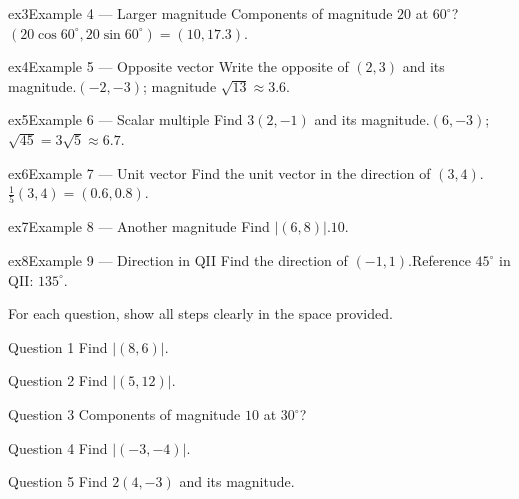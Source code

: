 \documentclass[11pt]{article}
\begin{document}
\begin{example}{ex3}{Example 4 --- Larger magnitude}
Components of magnitude $20$ at $60^\circ$?\soln $(20\cos60^\circ,20\sin60^\circ)=(10,17.3)$.
\end{example}

\begin{example}{ex4}{Example 5 --- Opposite vector}
Write the opposite of $(2,3)$ and its magnitude.\soln $(-2,-3)$; magnitude $\sqrt{13}\approx3.6$.
\end{example}

\begin{example}{ex5}{Example 6 --- Scalar multiple}
Find $3(2,-1)$ and its magnitude.\soln $(6,-3)$; $\sqrt{45}=3\sqrt5\approx6.7$.
\end{example}

\begin{example}{ex6}{Example 7 --- Unit vector}
Find the unit vector in the direction of $(3,4)$.\soln $\tfrac{1}{5}(3,4)=(0.6,0.8)$.
\end{example}

\begin{example}{ex7}{Example 8 --- Another magnitude}
Find $|(6,8)|$.\soln $10$.
\end{example}

\begin{example}{ex8}{Example 9 --- Direction in QII}
Find the direction of $(-1,1)$.\soln Reference $45^\circ$ in QII: $135^\circ$.
\end{example}

\clearpage
{}
For each question, show all steps clearly in the space provided.

\begin{qbox}{Question 1}
Find $|(8,6)|$.\workspace{2.4cm}
\end{qbox}

\begin{qbox}{Question 2}
Find $|(5,12)|$.\workspace{2.4cm}
\end{qbox}

\begin{qbox}{Question 3}
Components of magnitude $10$ at $30^\circ$?\workspace{2.4cm}
\end{qbox}

\begin{qbox}{Question 4}
Find $|(-3,-4)|$.\workspace{2.4cm}
\end{qbox}

\begin{qbox}{Question 5}
Find $2(4,-3)$ and its magnitude.\workspace{2.4cm}
\end{qbox}
\end{document}
